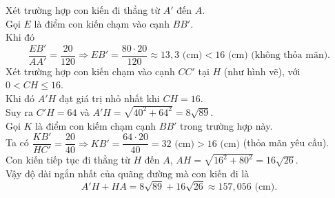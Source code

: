 \begin{ex}
{\begin{center}
		\end{center}
		Xét trường hợp con kiến đi thẳng từ $A'$ đến $A$.\\ Gọi $E$ là điểm con kiến chạm vào cạnh $BB'$.\\
		Khi đó
		\[\dfrac{EB'}{AA'}=\dfrac{20}{120} \Rightarrow EB'=\dfrac{80\cdot 20}{120} \approx 13{,}3 \text{ (cm)}<16 \text{ (cm)} \text{ (không thỏa mãn).}\]
		Xét trường hợp con kiến chạm vào cạnh $CC'$ tại $H$ (như hình vẽ), với $0<CH \leq 16$.\\
		Khi đó $A'H$ đạt giá trị nhỏ nhất khi $CH=16$.\\
		Suy ra $C'H=64$ và $A'H=\sqrt{40^2+64^2}=8 \sqrt{89}$.\\
		Gọi $K$ là điểm con kiếm chạm cạnh $BB'$ trong trường hợp này.\\
		Ta có $\dfrac{KB'}{HC'}=\dfrac{20}{40} \Rightarrow KB'=\dfrac{64\cdot 20}{40}=32 \text{ (cm)}>16 \text{ (cm)}$ (thỏa mãn yêu cầu).\\
		Con kiến tiếp tục đi thẳng từ $H$ đến $A$, $AH=\sqrt{16^2+80^2}=16\sqrt{26}$.\\
		Vậy độ dài ngắn nhất của quãng đường mà con kiến đi là
		\[A'H+HA=8\sqrt{89}+16\sqrt{26} \approx 157{,}056 \text{ (cm)}.\]
	}
\end{ex}

